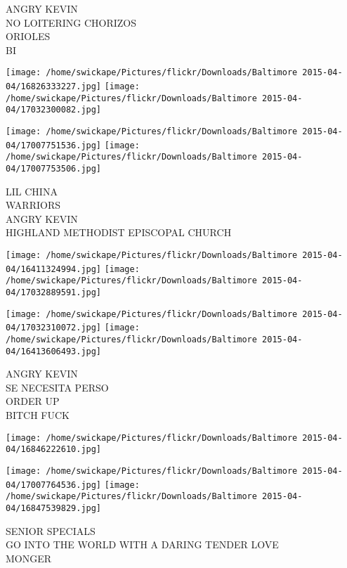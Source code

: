 \documentclass[10pt,letterpaper]{article}
\begin{document}
ANGRY KEVIN\\
NO LOITERING CHORIZOS\\
ORIOLES\\
BI\\
\pagebreak

\texttt{[image: /home/swickape/Pictures/flickr/Downloads/Baltimore 2015-04-04/16826333227.jpg]}
\texttt{[image: /home/swickape/Pictures/flickr/Downloads/Baltimore 2015-04-04/17032300082.jpg]}

\texttt{[image: /home/swickape/Pictures/flickr/Downloads/Baltimore 2015-04-04/17007751536.jpg]}
\texttt{[image: /home/swickape/Pictures/flickr/Downloads/Baltimore 2015-04-04/17007753506.jpg]}

LIL CHINA\\
WARRIORS\\
ANGRY KEVIN\\
HIGHLAND METHODIST EPISCOPAL CHURCH\\
\pagebreak

\texttt{[image: /home/swickape/Pictures/flickr/Downloads/Baltimore 2015-04-04/16411324994.jpg]}
\texttt{[image: /home/swickape/Pictures/flickr/Downloads/Baltimore 2015-04-04/17032889591.jpg]}

\texttt{[image: /home/swickape/Pictures/flickr/Downloads/Baltimore 2015-04-04/17032310072.jpg]}
\texttt{[image: /home/swickape/Pictures/flickr/Downloads/Baltimore 2015-04-04/16413606493.jpg]}

ANGRY KEVIN\\
SE NECESITA PERSO\\
ORDER UP\\
BITCH FUCK\\
\pagebreak

\texttt{[image: /home/swickape/Pictures/flickr/Downloads/Baltimore 2015-04-04/16846222610.jpg]}

\vspace{0.25in}
\texttt{[image: /home/swickape/Pictures/flickr/Downloads/Baltimore 2015-04-04/17007764536.jpg]}
\texttt{[image: /home/swickape/Pictures/flickr/Downloads/Baltimore 2015-04-04/16847539829.jpg]}

SENIOR SPECIALS\\
GO INTO THE WORLD WITH A DARING TENDER LOVE\\
MONGER\\
\pagebreak
\end{document}
